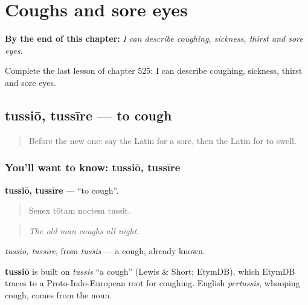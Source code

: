 
\chapter{Coughs and sore eyes}
\label{ch:la-coughs-and-sore-eyes}

\begin{chapteropening}
\textbf{By the end of this chapter:} \emph{I can describe coughing, sickness, thirst and sore eyes.}

Complete the last lesson of chapter 525: I can describe coughing, sickness, thirst and sore eyes.
\end{chapteropening}

\section[tussiō, tussīre]{tussiō, tussīre — to cough}

\label{lesson:LA-C525-tussio}



\begin{quote}
Before the new one: say the Latin for a sore, then the Latin for to swell.
\end{quote}

\subsection*{You'll want to know: tussiō, tussīre}
\textbf{tussiō, tussīre} — \textquotedblleft{}to cough\textquotedblright{}.

\begin{quote}
Senex tōtam noctem tussit.
\end{quote}

\begin{quote}
\emph{The old man coughs all night.}
\end{quote}

\emph{tussiō, tussīre}, from \emph{tussis} — a cough, already known.

\begin{cousinweb}
\textbf{tussiō} is built on \emph{tussis} \textquotedblleft{}a cough\textquotedblright{} (Lewis \& Short; EtymDB), which EtymDB traces to a Proto-Indo-European root for coughing. English \emph{pertussis}, whooping cough, comes from the noun.
\end{cousinweb}

